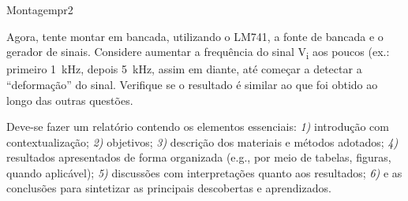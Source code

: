 \begin{problem}{Montagem}{pr2}

Agora, tente montar em bancada, utilizando o LM741, a fonte de bancada e o gerador de sinais. Considere aumentar a frequência do sinal V\textsubscript{i} aos poucos (ex.: primeiro \SI{1}{\kilo\hertz}, depois \SI{5}{\kilo\hertz}, assim em diante, até começar a detectar a ``deformação'' do sinal. Verifique se o resultado é similar ao que foi obtido ao longo das outras questões. \\

\end{problem}

\begin{obs}

Deve-se fazer um relatório contendo os elementos essenciais: \textit{1)} introdução com contextualização; \textit{2)} objetivos; \textit{3)} descrição dos materiais e métodos adotados; \textit{4)} resultados apresentados de forma organizada (e.g., por meio de tabelas, figuras, quando aplicável); \textit{5)} discussões com interpretações quanto aos resultados; \textit{6)} e as conclusões para sintetizar as principais descobertas e aprendizados.

\end{obs}

\newpage

\printbibliography


